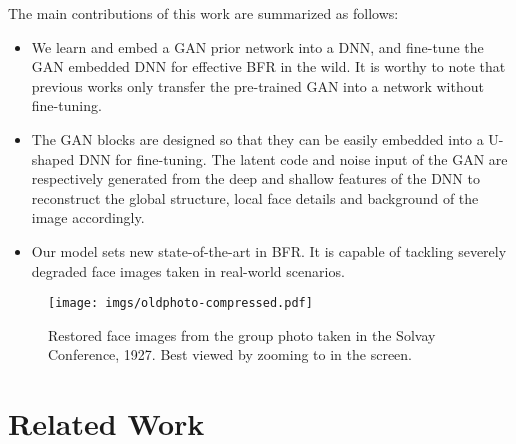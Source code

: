 \documentclass[final]{cvpr}
\begin{document}
\vspace*{2mm}
The main contributions of this work are summarized as follows:
\vspace*{-2mm}
\begin{itemize}
  \setlength{\itemsep}{0.7pt}
  \setlength{\parsep}{0.7pt}
  \setlength{\parskip}{0.7pt}
\item We learn and embed a GAN prior network into a DNN, and fine-tune the GAN embedded DNN for effective BFR in the wild. It is worthy to note that previous works only transfer the pre-trained GAN into a network without fine-tuning.
   \item The GAN blocks are designed so that they can be easily embedded into a U-shaped DNN for fine-tuning. The latent code and noise input of the GAN are respectively generated from the deep and shallow features of the DNN to reconstruct the global structure, local face details and background of the image accordingly.
   \item Our model sets new state-of-the-art in BFR. It is capable of tackling severely degraded face images taken in real-world scenarios.
\end{itemize}
\vspace*{-2mm}

\begin{figure}
   \texttt{[image: imgs/oldphoto-compressed.pdf]}
   \caption{Restored face images from the group photo taken in the Solvay Conference, 1927. Best viewed by zooming to  in the screen.}
\label{fig:oldphotos}
\vspace*{-5mm}
\end{figure}

\section{Related Work}
\end{document}
